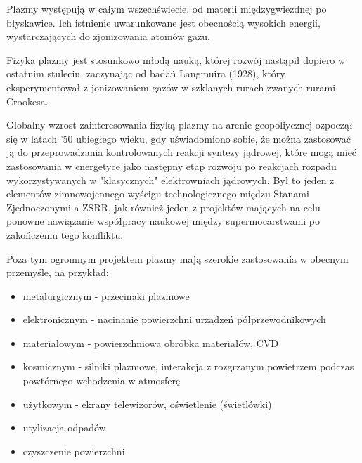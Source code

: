     Plazmy występują w całym wszechświecie, od materii międzygwiezdnej po błyskawice.
    Ich istnienie uwarunkowane jest obecnością wysokich energii, wystarczających do zjonizowania atomów gazu.

    Fizyka plazmy jest stosunkowo młodą nauką, której rozwój nastąpił dopiero w ostatnim stuleciu, zaczynając od badań
    Langmuira (1928), który eksperymentował z jonizowaniem gazów w szklanych rurach zwanych rurami Crookesa. 
    
    Globalny wzrost zainteresowania fizyką plazmy na arenie geopoliycznej ozpoczął się w latach '50 ubiegłego wieku, 
    gdy uświadomiono sobie, że można zastosować ją do przeprowadzania kontrolowanych reakcji syntezy jądrowej, 
    które mogą mieć zastosowania w energetyce jako następny etap rozwoju po reakcjach rozpadu wykorzystywanych
    w "klasycznych" elektrowniach jądrowych. Był to jeden z elementów zimnowojennego wyścigu technologicznego
    międzu Stanami Zjednoczonymi a ZSRR, 
    jak również jeden z projektów mających na celu ponowne nawiązanie współpracy naukowej między supermocarstwami
    po zakończeniu tego konfliktu. 

    Poza tym ogromnym projektem plazmy mają szerokie zastosowania w obecnym przemyśle, na przykład:
    \begin{itemize}
        \item metalurgicznym - przecinaki plazmowe 
        \item elektronicznym - nacinanie powierzchni urządzeń półprzewodnikowych 
        \item materiałowym - powierzchniowa obróbka materiałów, 
            CVD 
        \item kosmicznym - silniki plazmowe, interakcja z rozgrzanym powietrzem podczas powtórnego wchodzenia 
            w atmosferę 
        \item użytkowym - ekrany telewizorów, oświetlenie (świetlówki)
        \item utylizacja odpadów 
        \item czyszczenie powierzchni 
    \end{itemize}

